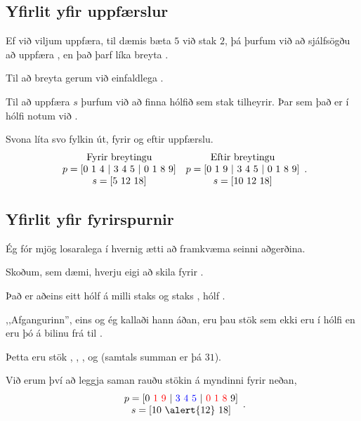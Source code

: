\subsection{Yfirlit yfir uppfærslur}
{
	{
		\item<1-> Ef við viljum uppfæra, til dæmis bæta $5$ við stak $2$, þá þurfum við að sjálfsögðu að uppfæra
			, en það þarf líka breyta .
		\item<2-> Til að breyta  gerum við einfaldlega .
		\item<3-> Til að uppfæra $s$ þurfum við að finna hólfið sem stak  tilheyrir. Þar sem það er í hólfi 
			notum við .
		\item<4-> Svona líta svo fylkin út, fyrir og eftir uppfærslu.
			\[
			\begin {array}{c c}
			\text{Fyrir breytingu} & \text{Eftir breytingu}\\
				p = [0\ 1\ 4\ |\ 3\ 4\ 5\ |\ 0\ 1\ 8\ 9] & p = [0\ 1\ 9\ |\ 3\ 4\ 5\ |\ 0\ 1\ 8\ 9]\\
				s = [5\ 12\ 18] & s = [10\ 12\ 18]
			\end {array}.
			\]
	}
}

\subsection{Yfirlit yfir fyrirspurnir}
{
	{
		\item<1-> Ég fór mjög losaralega í hvernig ætti að framkvæma seinni aðgerðina.
		\item<2-> Skoðum, sem dæmi, hverju eigi að skila fyrir .
		\item<3-> Það er aðeins eitt hólf á milli staks  og staks , hólf .
		\item<4-> ,,Afgangurinn'', eins og ég kallaði hann áðan, eru þau stök sem ekki eru í hólfi 
			en eru þó á bilinu frá  til .
		\item<5-> Þetta eru stök , , ,  og  (samtals summan er þá $31$).
		\item<6-> Við erum því að leggja saman rauðu stökin á myndinni fyrir neðan,
			\[
			\begin {array}{c}
				p = [0\ {\color{red} 1 \ 9\ }|\ {\color{blue}3\ 4\ 5\ } |\ {\color{red} 0\ 1\ 8\ } 9]\\ 
				s = [10\ \alert{12}\ 18]
		\end {array}.
			\]
	}
}


